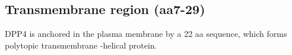 \subsection{Transmembrane region (aa7-29)}

DPP4 is anchored in the plasma membrane by a 22 aa  sequence, which forms polytopic transmembrane \alpha-helical protein. \cite{Hong_1990}
